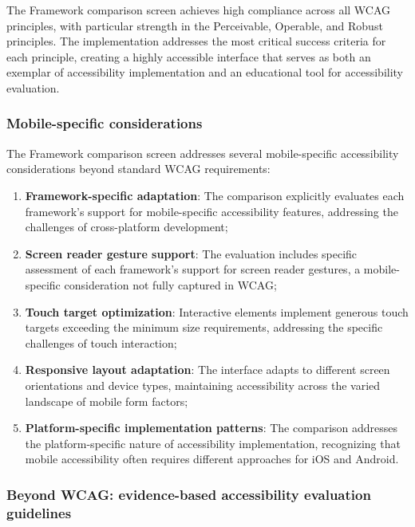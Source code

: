 The Framework comparison screen achieves high compliance across all WCAG principles, with particular strength in the Perceivable, Operable, and Robust principles. The implementation addresses the most critical success criteria for each principle, creating a highly accessible interface that serves as both an exemplar of accessibility implementation and an educational tool for accessibility evaluation.

\subsubsection{Mobile-specific considerations}

The Framework comparison screen addresses several mobile-specific accessibility considerations beyond standard WCAG requirements:

\begin{enumerate}
    \item \textbf{Framework-specific adaptation}: The comparison explicitly evaluates each framework's support for mobile-specific accessibility features, addressing the challenges of cross-platform development;
    
    \item \textbf{Screen reader gesture support}: The evaluation includes specific assessment of each framework's support for screen reader gestures, a mobile-specific consideration not fully captured in WCAG;
    
    \item \textbf{Touch target optimization}: Interactive elements implement generous touch targets exceeding the minimum size requirements, addressing the specific challenges of touch interaction;
    
    \item \textbf{Responsive layout adaptation}: The interface adapts to different screen orientations and device types, maintaining accessibility across the varied landscape of mobile form factors;
    
    \item \textbf{Platform-specific implementation patterns}: The comparison addresses the platform-specific nature of accessibility implementation, recognizing that mobile accessibility often requires different approaches for iOS and Android.
\end{enumerate}

\subsubsection{Beyond WCAG: evidence-based accessibility evaluation guidelines}


